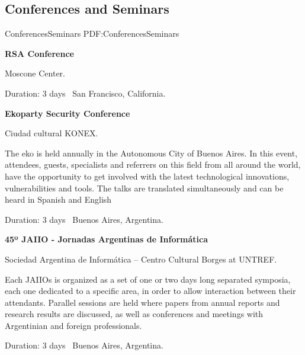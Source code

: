 \documentclass[letterpaper,MMMyyyy,nonstop]{simpleresumecv}
\begin{document}
\begin{body}

\section{Conferences\newline 
	and Seminars}
{ConferencesSeminars}
{PDF:ConferencesSeminars}

\textbf{RSA Conference}
\hfill
{}

\BulletItem Moscone Center.

Duration: 3 days \SubBulletSymbol\, San Francisco, California.

\BigGap

\textbf{Ekoparty Security Conference}
\hfill
{}

\BulletItem Ciudad cultural KONEX.
\begin{detail}
	\SubBulletItem
	The eko is held annually in the Autonomous City of Buenos Aires. In this event, attendees, guests, specialists and referrers on this field from all around the world, have the opportunity to get involved with the latest technological innovations, vulnerabilities and tools. The talks are translated simultaneously and can be heard in Spanish and English
\end{detail}
Duration: 3 days \SubBulletSymbol\, Buenos Aires, Argentina.

\BigGap

\textbf{45º JAIIO - Jornadas Argentinas de Informática}
\hfill
{}

\BulletItem Sociedad Argentina de Informática – Centro Cultural Borges at UNTREF.
\begin{detail}
	\SubBulletItem
	Each JAIIOs is organized as a set of one or two days long separated symposia, each one dedicated to a specific area, in order to allow interaction between their attendants. Parallel sessions are held where papers from annual reports and research results are discussed, as well as conferences and meetings with Argentinian and foreign professionals.
\end{detail}
Duration: 3 days \SubBulletSymbol\, Buenos Aires, Argentina.


\end{body}
\end{document}
